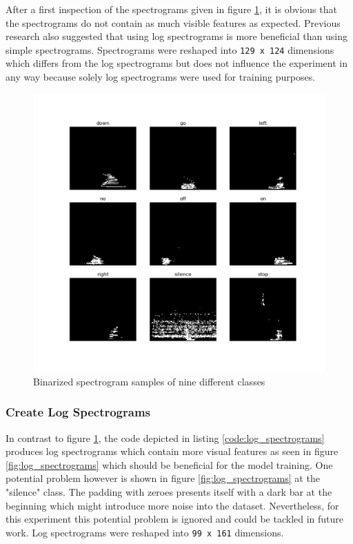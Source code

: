\documentclass{article}
\theoremstyle{definition}
\theoremstyle{remark}
\begin{document}
After a first inspection of the spectrograms given in figure \ref{fig:spectrograms}, it is obvious that the spectrograms do not contain as much visible features as expected. Previous research \cite{gouda2018speech} also suggested that using log spectrograms is more beneficial than using simple spectrograms. Spectrograms were reshaped into \texttt{129 x 124} dimensions which differs from the log spectrograms but does not influence the experiment in any way because solely log spectrograms were used for training purposes.


\begin{figure}[h!]
    \centering
    \includegraphics[width=1\textwidth]{img/9_spectrograms_binarized.png}
    \caption{Binarized spectrogram samples of nine different classes}
    \label{fig:spectrograms}
\end{figure}



\subsubsection{Create Log Spectrograms}

In contrast to figure \ref{fig:spectrograms}, the code depicted in listing \ref{code:log_spectrograms} produces log spectrograms which contain more visual features as seen in figure \ref{fig:log_spectrograms} which should be beneficial for the model training. One potential problem however is shown in figure \ref{fig:log_spectrograms} at the "silence" class. The padding with zeroes presents itself with a dark bar at the beginning which might introduce more noise into the dataset. Nevertheless, for this experiment this potential problem is ignored and could be tackled in future work. Log spectrograms were reshaped into \texttt{99 x 161} dimensions.
\end{document}
